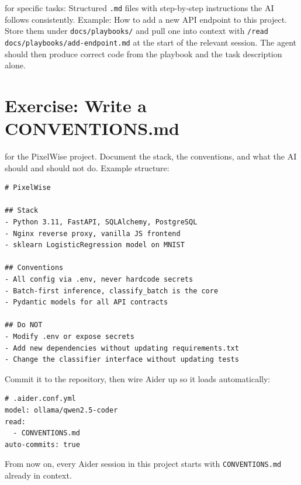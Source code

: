  for specific tasks: Structured \texttt{.md} files with
step-by-step instructions the AI follows consistently. Example: How to add a new API endpoint to
this project. Store them under \texttt{docs/playbooks/} and pull one into context with
\texttt{/read docs/playbooks/add-endpoint.md} at the start of the relevant session. The agent
should then produce correct code from the playbook and the task description alone.


\newpage
\section{Exercise: Write a CONVENTIONS.md}

 for the PixelWise project. Document the stack, the
conventions, and what the AI should and should not do. Example structure:

\begin{verbatim}
# PixelWise

## Stack
- Python 3.11, FastAPI, SQLAlchemy, PostgreSQL
- Nginx reverse proxy, vanilla JS frontend
- sklearn LogisticRegression model on MNIST

## Conventions
- All config via .env, never hardcode secrets
- Batch-first inference, classify_batch is the core
- Pydantic models for all API contracts

## Do NOT
- Modify .env or expose secrets
- Add new dependencies without updating requirements.txt
- Change the classifier interface without updating tests
\end{verbatim}

Commit it to the repository, then wire Aider up so it loads automatically:

\begin{verbatim}
# .aider.conf.yml
model: ollama/qwen2.5-coder
read:
  - CONVENTIONS.md
auto-commits: true
\end{verbatim}

From now on, every Aider session in this project starts with \texttt{CONVENTIONS.md} already in
context.

\newpage
